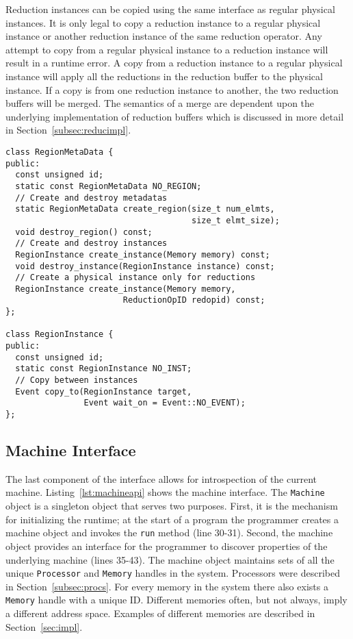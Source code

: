 Reduction instances can be copied using the same interface as regular physical instances.
It is only legal to copy a reduction instance to a regular physical instance or another
reduction instance of the same reduction operator.  Any attempt to copy from a regular physical 
instance to a reduction instance will result in a runtime error.  A copy from a reduction 
instance to a regular physical instance will apply all the reductions in the reduction 
buffer to the physical instance.  If a copy is from one reduction instance to another, 
the two reduction buffers will be merged.  The semantics of a merge are dependent upon 
the underlying implementation of reduction buffers which is discussed in more detail 
in Section~\ref{subsec:reducimpl}.

\begin{lstlisting}[float={t},label={lst:regionapi},caption={Subset of Physical Region Interface.}]
class RegionMetaData {
public:
  const unsigned id;
  static const RegionMetaData NO_REGION;
  // Create and destroy metadatas
  static RegionMetaData create_region(size_t num_elmts, 
                                      size_t elmt_size);
  void destroy_region() const;
  // Create and destroy instances
  RegionInstance create_instance(Memory memory) const;
  void destroy_instance(RegionInstance instance) const;
  // Create a physical instance only for reductions
  RegionInstance create_instance(Memory memory, 
                        ReductionOpID redopid) const;
};

class RegionInstance {
public:
  const unsigned id;
  static const RegionInstance NO_INST;
  // Copy between instances
  Event copy_to(RegionInstance target, 
                Event wait_on = Event::NO_EVENT);
};
\end{lstlisting}


\subsection{Machine Interface}
\label{subsec:machmodel}
The last component of the interface allows for introspection of the current machine.
Listing~\ref{lst:machineapi} shows the machine interface.
The {\tt Machine} object is a singleton object that serves two purposes.  First, it
is the mechanism for initializing the runtime; at the start of a program the programmer
creates a machine object and invokes the {\tt run} method (line 30-31).
Second, the machine object provides an interface for the programmer to 
discover properties of the underlying machine (lines 35-43).  The machine object maintains
sets of all the unique {\tt Processor} and {\tt Memory} handles in the system.  Processors
were described in Section~\ref{subsec:procs}.  For every memory in the system there also 
exists a {\tt Memory} handle with a unique ID.  Different memories often, but not always, 
imply a different address space.  Examples of different memories are described in
Section~\ref{sec:impl}.

